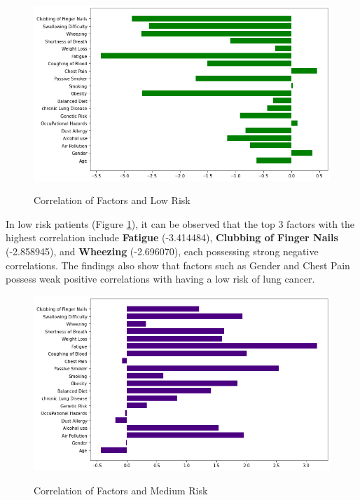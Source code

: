 \documentclass[runningheads]{llncs}
\begin{document}
\begin{figure}[!htb]           	 
\centering               	 
\caption{Correlation of Factors and Low Risk}
\includegraphics[scale=0.5]{fta-low.png}  	 
\label{fig:fta-low}
\end{figure}

In low risk patients (Figure \ref{fig:fta-low}), it can be observed that the top 3 factors with the highest correlation include \textbf{Fatigue} (-3.414484), \textbf{Clubbing of Finger Nails} (-2.858945), and \textbf{Wheezing} (-2.696070), each possessing strong negative correlations. The findings also show that factors such as Gender and Chest Pain possess weak positive correlations with having a low risk of lung cancer.

\begin{figure}[!htb]           	 
\centering               	 
\caption{Correlation of Factors and Medium Risk}
\includegraphics[scale=0.5]{fta-medium.png}  	 
\label{fig:fta-medium}
\end{figure}
\end{document}
